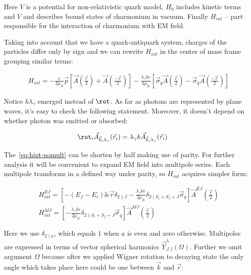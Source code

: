 Here $V$ is a potential for non-relativistic quark model, $H_0$ includes kinetic terms and $V$ and describes bound states of charmonium in vacuum. Finally $H_{int}$ -- part responsible for the interaction of charmonium with EM field.

Taking into account that we have a quark-antiquark system, charges of the particles differ only by sign and we can rewrite $H_{int}$ in the center of mass frame grouping similar terms:

\begin{align} \label{eq:hint-nomult}
    &H_{int} = -\frac{e}{2 \mu_R} \vec{p} \left[ \vec{A}(\frac{\vec{r}}{2}) + \vec{A}(\frac{-\vec{r}}{2}) \right]-\frac{\lambda_\gamma k e}{4 \mu_R}\left[ \vec{\sigma}_q \vec{A}(\frac{\vec{r}}{2}) - \vec{\sigma}_{\bar{q}} \vec{A}(\frac{-\vec{r}}{2}) \right]
\end{align}

Notice $k \lambda_\gamma$ emerged instead of $\rot$. As far as photons are represented by plane waves, it's easy to check the following statement. Moreover, it doesn't depend on whether photon was emitted or absorbed:

\begin{align}
    &\rot_i \vec{A}_{\vec{k}, \lambda_\gamma}(\vec{r}_i) = \lambda_\gamma k \vec{A}_{\vec{k}, \lambda_\gamma}(\vec{r}_i)
\end{align}

The~\cref{eq:hint-nomult} can be shorten by half making use of parity. For further analysis it will be convenient to expand EM field into multipole series. Each multipole transforms in a defined way under parity, so $H_{int}$ acquires simpler form:

\begin{align} \label{hint-mult-nobrak}
    &H_{int}^{EJ} = \left[ -(E_f - E_i) \ii e \vec{r} \delta_{2 \nmid J} - \frac{\lambda_\gamma k e}{2 \mu_R} \delta_{2 \mid S_i + S_f + J} \vec{\sigma}_q \right] \vec{A}^{EJ}(\frac{\vec{r}}{2}) \\
    &H_{int}^{MJ} = \left[ - \frac{\lambda_\gamma k e}{2 \mu_R} \delta_{2 \nmid S_i + S_f + J} \vec{\sigma}_q \right] \vec{A}^{MJ}(\frac{\vec{r}}{2}) 
\end{align}

Here we use $\delta_{2 \mid a}$, which equals $1$ when $a$ is even and zero otherwise. Multipoles are expressed in terms of vector spherical harmonics $\vec{Y}^\lambda_{J, l}(\Omega)$. Further we omit argument $\Omega$ because after we applied Wigner rotation to decaying state the only angle which takes place here could be one between $\vec{k}$ and $\vec{r}$:

